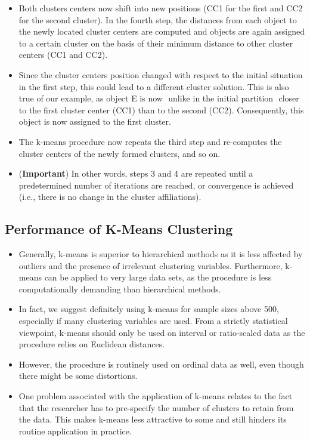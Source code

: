 \documentclass[a4paper,12pt]{article}
\begin{document}
\begin{itemize}
\begin{figure}[h!]
\begin{center}
	\end{center}
\end{figure}
\item Both clusters centers now shift into new positions (CC1 for the first and CC2 for the second cluster).
In the fourth step, the distances from each object to the newly located cluster
centers are computed and objects are again assigned to a certain cluster on the basis
of their minimum distance to other cluster centers (CC1 and CC2).

\item Since the cluster centers position changed with respect to the initial situation in the first step,
this could lead to a different cluster solution. This is also true of our example, as
object E is now  unlike in the initial partition  closer to the first cluster center
(CC1) than to the second (CC2). Consequently, this object is now assigned to the
first cluster.
\item The k-means procedure now repeats the third step and
re-computes the cluster centers of the newly formed clusters, and so on.
\item (\textbf{Important}) In other words, steps 3 and 4 are repeated until a predetermined number of iterations are
reached, or convergence is achieved (i.e., there is no change in the cluster affiliations).
\end{itemize}
\subsection{Performance of K-Means Clustering}
\begin{itemize}
\item Generally, k-means is superior to hierarchical methods as it is less affected by
outliers and the presence of irrelevant clustering variables. Furthermore, k-means
can be applied to very large data sets, as the procedure is less computationally
demanding than hierarchical methods. 
\item In fact, we suggest definitely using k-means
for sample sizes above 500, especially if many clustering variables are used. From
a strictly statistical viewpoint, k-means should only be used on interval or ratio-scaled
data as the procedure relies on Euclidean distances. 
\item However, the procedure is
routinely used on ordinal data as well, even though there might be some distortions.

\item One problem associated with the application of k-means relates to the fact that
the researcher has to pre-specify the number of clusters to retain from the data. This
makes k-means less attractive to some and still hinders its routine application in
practice.
\end{itemize}
\end{document}
